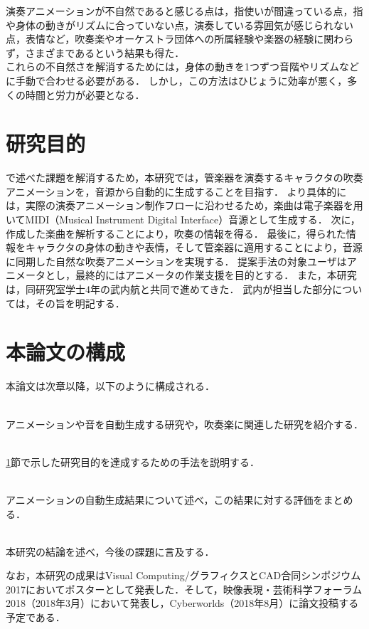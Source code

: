\par
演奏アニメーションが不自然であると感じる点は，指使いが間違っている点，指や身体の動きがリズムに合っていない点，演奏している雰囲気が感じられない点，表情など，吹奏楽やオーケストラ団体への所属経験や楽器の経験に関わらず，さまざまであるという結果も得た．\\
\indent
これらの不自然さを解消するためには，身体の動きを1つずつ音階やリズムなどに手動で合わせる必要がある．
しかし，この方法はひじょうに効率が悪く，多くの時間と労力が必要となる．

\section{研究目的}\label{sec:purpose}
で述べた課題を解消するため，本研究では，管楽器を演奏するキャラクタの吹奏アニメーションを，音源から自動的に生成することを目指す．
より具体的には，実際の演奏アニメーション制作フローに沿わせるため，楽曲は電子楽器を用いてMIDI（Musical Instrument Digital Interface）音源として生成する．
次に，作成した楽曲を解析することにより，吹奏の情報を得る．
最後に，得られた情報をキャラクタの身体の動きや表情，そして管楽器に適用することにより，音源に同期した自然な吹奏アニメーションを実現する．
提案手法の対象ユーザはアニメータとし，最終的にはアニメータの作業支援を目的とする．
また，本研究は，同研究室学士4年の武内航と共同で進めてきた．
武内が担当した部分については，その旨を明記する．

\section{本論文の構成}\label{sec:structure}
本論文は次章以降，以下のように構成される．
\begin{description}
	\setlength{\itemindent}{4pt}
	\item[第2章 関連研究] \mbox{}\\
	\hspace{3ex}アニメーションや音を自動生成する研究や，吹奏楽に関連した研究を紹介する．
	\item[第3章 提案手法] \mbox{}\\
	\hspace{3ex} \ref{sec:purpose}節で示した研究目的を達成するための手法を説明する．
	\item[第4章 自動生成結果と評価] \mbox{}\\
	\hspace{3ex} アニメーションの自動生成結果について述べ，この結果に対する評価をまとめる．
	\item[第5章 結論] \mbox{}\\
	\hspace{3ex} 本研究の結論を述べ，今後の課題に言及する．
\end{description}
\indent
なお，本研究の成果はVisual Computing/グラフィクスとCAD合同シンポジウム2017においてポスター\cite{vc}として発表した．そして，映像表現・芸術科学フォーラム2018（2018年3月）において発表し，Cyberworlds（2018年8月）に論文投稿する予定である．